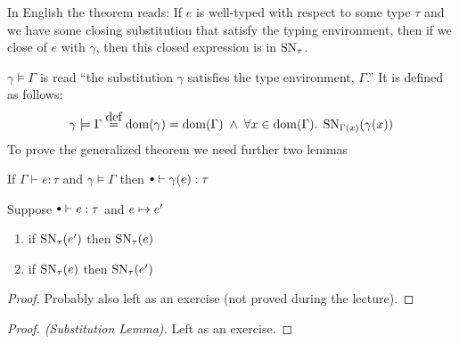 In English the theorem reads: If $e$ is well-typed with respect to some type $\tau$ and we have some closing substitution that satisfy the typing environment, then if we close of $e$ with $\gamma$, then this closed expression is in $\operatorname{SN}_\tau$.

$\gamma \models \Gamma$ is read ``the substitution $\gamma$ satisfies the type environment, $\Gamma$.'' It is defined as follows:
\[
  \gamma \models \Gamma \eqdef \dom(\gamma) = \dom(\Gamma) \pand 
                 \forall x \in \dom(\Gamma). \; \SN{\Gamma(x)}{\gamma(x)}
\]
To prove the generalized theorem we need further two lemmas
\begin{substlem}
  If $\Gamma \vdash e : \tau$ and $\gamma \models \Gamma$ then $\mtenv \vdash \gamma (e) : \tau$
\end{substlem}
\begin{forback}
  Suppose $\mtenv \vdash e : \tau$ and $e \mapsto e'$
  \begin{enumerate}
  \item if $\operatorname{SN}_{\tau}(e')$ then $\operatorname{SN}_{\tau}(e)$
  \item if $\operatorname{SN}_{\tau}(e)$ then $\operatorname{SN}_{\tau}(e')$
  \end{enumerate}
\end{forback}
\begin{proof}
  Probably also left as an exercise (not proved during the lecture).
\end{proof}
\begin{proof}[Proof. (Substitution Lemma)] 
  Left as an exercise.
\end{proof}
